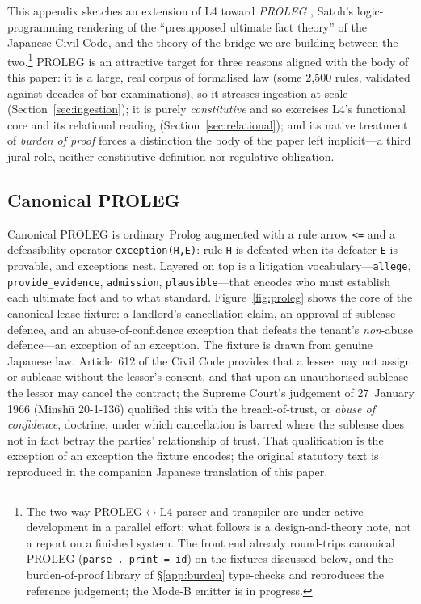 \documentclass[sigconf,nonacm]{acmart}
\newcommand{\code}[1]{\texttt{\small #1}}
\begin{document}
This appendix sketches an extension of L4 toward \emph{PROLEG}
\cite{satoh2011proleg}, Satoh's logic-programming rendering of the
``presupposed ultimate fact theory'' of the Japanese Civil Code, and the
theory of the bridge we are building between the two.\footnote{The two-way
PROLEG$\leftrightarrow$L4 parser and transpiler are under active development
in a parallel effort; what follows is a design-and-theory note, not a report
on a finished system. The front end already round-trips canonical PROLEG
(\code{parse . print = id}) on the fixtures discussed below, and the
burden-of-proof library of \S\ref{app:burden} type-checks and reproduces the
reference judgement; the Mode-B emitter is in progress.} PROLEG is an
attractive target for three reasons aligned with the body of this paper: it
is a large, real corpus of formalised law (some 2{,}500 rules, validated
against decades of bar examinations), so it stresses ingestion at scale
(Section~\ref{sec:ingestion}); it is purely \emph{constitutive} and so
exercises L4's functional core and its relational reading
(Section~\ref{sec:relational}); and its native treatment of \emph{burden of
proof} forces a distinction the body of the paper left implicit---a third
jural role, neither constitutive definition nor regulative obligation.

\subsection{Canonical PROLEG}
Canonical PROLEG is ordinary Prolog augmented with a rule arrow \code{<=} and
a defeasibility operator \code{exception(H,E)}: rule \code{H} is defeated
when its defeater \code{E} is provable, and exceptions nest. Layered on top
is a litigation vocabulary---\code{allege}, \code{provide\_evidence},
\code{admission}, \code{plausible}---that encodes who must establish each
ultimate fact and to what standard. Figure~\ref{fig:proleg} shows the core of
the canonical lease fixture: a landlord's cancellation claim, an
approval-of-sublease defence, and an abuse-of-confidence exception that
defeats the tenant's \emph{non}-abuse defence---an exception of an exception.
The fixture is drawn from genuine Japanese law. Article~612 of the Civil
Code provides that a lessee may not assign or sublease without the lessor's
consent, and that upon an unauthorised sublease the lessor may cancel the
contract; the Supreme Court's judgement of 27~January 1966 (Minsh\=u 20-1-136)
qualified this with the breach-of-trust, or \emph{abuse of confidence},
doctrine, under which cancellation is barred where the sublease does not in
fact betray the parties' relationship of trust. That qualification is the
exception of an exception the fixture encodes; the original statutory text is
reproduced in the companion Japanese translation of this paper.
\end{document}
